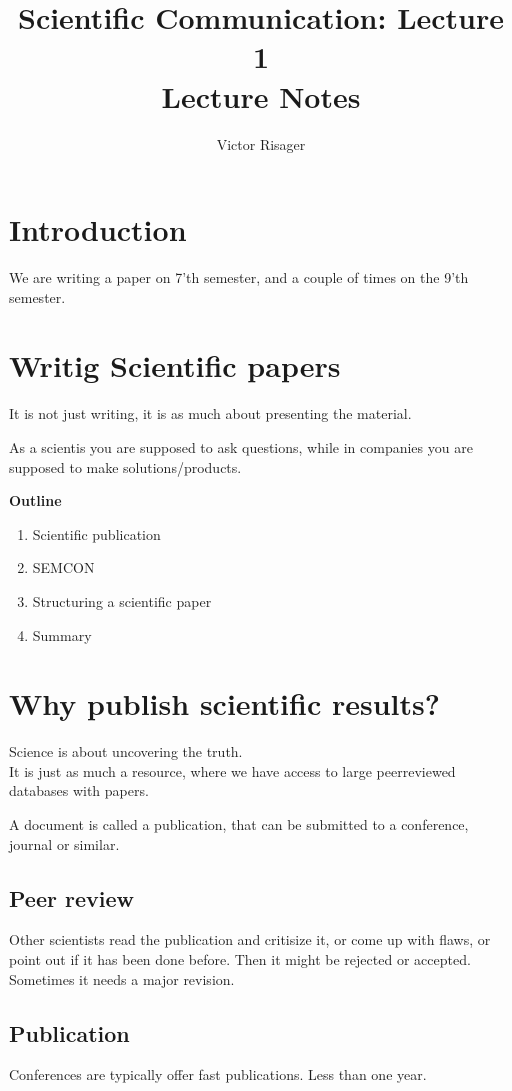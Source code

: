 \documentclass[a4paper]{article}
\title{Scientific Communication: Lecture 1 \\
	\large Lecture Notes}
\author{Victor Risager}
\begin{document}
\maketitle

\section{Introduction}
We are writing a paper on 7'th semester, and a couple of times on the 9'th semester.

\section{Writig Scientific papers}
It is not just writing, it is as much about presenting the material.

As a scientis you are supposed to ask questions, while in companies you are supposed to make solutions/products. 


\textbf{Outline} 
\begin{enumerate}
	\item Scientific publication
	\item SEMCON
	\item Structuring a scientific paper
	\item Summary
\end{enumerate}

\section{Why publish scientific results?}
Science is about uncovering the truth. \\
It is just as much a resource, where we have access to large peerreviewed databases with papers.

A document is called a publication, that can be submitted to a conference, journal or similar.

\subsection{Peer review}
Other scientists read the publication and critisize it, or come up with flaws, or point out if it has been done before. Then it might be rejected or accepted. Sometimes it needs a major revision.


\subsection{Publication}
Conferences are typically offer fast publications. Less than one year. 
\end{document}
